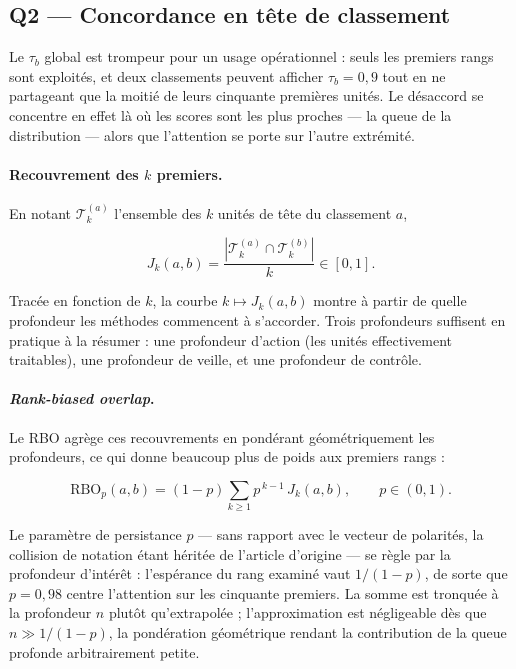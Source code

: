 \documentclass[11pt,a4paper]{article}
\theoremstyle{definition}
\theoremstyle{remark}
\newcommand{\abs}[1]{\left\lvert #1 \right\rvert}
\begin{document}
\bigskip

\subsection{Q2 --- Concordance en tête de classement}
\label{sec:q2}

\medskip

Le $\tau_b$ global est trompeur pour un usage opérationnel : seuls les premiers rangs sont
exploités, et deux classements peuvent afficher $\tau_b = 0{,}9$ tout en ne partageant que
la moitié de leurs cinquante premières unités. Le désaccord se concentre en effet là où les
scores sont les plus proches --- la queue de la distribution --- alors que l'attention se
porte sur l'autre extrémité.

\bigskip

\paragraph{Recouvrement des $k$ premiers.} En notant $\mathcal{T}^{(a)}_k$ l'ensemble des
$k$ unités de tête du classement $a$,

\medskip

\[
  J_k(a,b) = \frac{\abs{\mathcal{T}^{(a)}_k \cap \mathcal{T}^{(b)}_k}}{k} \in [0,1].
\]

\bigskip

Tracée en fonction de $k$, la courbe $k \mapsto J_k(a,b)$ montre à partir de quelle
profondeur les méthodes commencent à s'accorder. Trois profondeurs suffisent en pratique à
la résumer : une profondeur d'action (les unités effectivement traitables), une profondeur
de veille, et une profondeur de contrôle.

\bigskip

\paragraph{\emph{Rank-biased overlap}.} Le RBO \citep{webber2010} agrège ces recouvrements
en pondérant géométriquement les profondeurs, ce qui donne beaucoup plus de poids aux
premiers rangs :

\medskip

\[
  \mathrm{RBO}_p(a,b) = (1-p)\sum_{k \ge 1} p^{\,k-1}\, J_k(a,b),
  \qquad p \in (0,1).
\]

\bigskip

Le paramètre de persistance $p$ --- sans rapport avec le vecteur de polarités, la collision
de notation étant héritée de l'article d'origine --- se règle par la profondeur d'intérêt :
l'espérance du rang examiné vaut $1/(1-p)$, de sorte que $p = 0{,}98$ centre l'attention
sur les cinquante premiers. La somme est tronquée à la profondeur $n$ plutôt
qu'extrapolée ; l'approximation est négligeable dès que $n \gg 1/(1-p)$, la pondération
géométrique rendant la contribution de la queue profonde arbitrairement petite.
\end{document}
